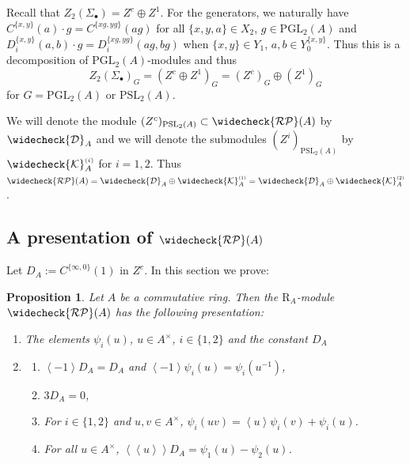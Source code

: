 \documentclass[12pt]{amsart}
\newtheorem{prop}[lem]{Proposition}
\theoremstyle{definition}
\newtheorem{rem}[lem]{Remark}
\renewcommand{\iff}{\Longleftrightarrow}
\newcommand{\K}{\mathcal{K}}
\newcommand{\wn}[1]{\mathcal{W}_{#1}}%
\newcommand{\pspl}[2]{\mathrm{PSL}_{#1}(#2)}
\newcommand{\pgl}[2]{\mathrm{PGL}_{#1}(#2)}
\newcommand{\crpb}[1]{\widecheck{\mathcal{RP}}(#1)}
\newcommand{\suss}[2]{\psi_{#1}\left( #2\right)}
\newcommand{\cks}[2]{\widecheck{{\K}}^{\mbox{\tiny $(#1)$}}_{#2}}
\newcommand{\cconst}[1]{D_{#1}}
\newcommand{\ccconstmod}[1]{\widecheck{\mathcal{D}}_{#1}}
\newcommand{\<}{\langle}
\renewcommand{\>}{\rangle}
\newcommand{\sgr}[1]{\mathrm{R}_{#1}}%
\newcommand{\an}[1]{\left\langle{#1}\right\rangle}
\newcommand{\pf}[1]{\left\langle\!\left\langle{#1}\right\rangle\!\right\rangle}
\begin{document}


Recall that $Z_2(\Sigma_\bullet)=Z^c\oplus Z^1$. For the generators, we naturally have $C^{\{ x,y\}}(a)\cdot g=C^{\{ xg,yg\}}(ag)$ for all $\{x,y,a\}\in X_2$, $g\in \pgl{2}{A}$ and 
$D_i^{\{ x,y\}}(a,b)\cdot g=D_i^{\{ xg,yg\}}(ag,bg)$ when $\{ x,y\}\in Y_1$, $a,b\in Y^{\{ x,y\}}_0$. Thus this is a decomposition of $\pgl{2}{A}$-modules and thus 
\[
Z_2(\Sigma_\bullet)_G=(Z^c\oplus Z^1)_G=(Z^c)_G\oplus (Z^1)_G
\]
for $G=\pgl{2}{A}$ or $\pspl{2}{A}$.


We will denote the module $(Z^c)_{\pspl{2}{A}}\subset \crpb{A}$ by $\ccconstmod{A}$ and we will denote the submodules $(Z^i)_{\pspl{2}{A}}$ by $\cks{i}{A}$ for $i=1,2$. Thus
$\crpb{A}=\ccconstmod{A}\oplus \cks{1}{A}=\ccconstmod{A}\oplus \cks{2}{A}$.

\subsection{A presentation of $\crpb{A}$}
Let $\cconst{A}:=C^{\{ \infty,0\}}(1)$ in $Z^c$. In this section we prove:

\begin{prop}\label{prop:crpbpres}  Let $A$ be a commutative ring. Then the $\sgr{A}$-module $\crpb{A}$ has the following presentation:

\begin{enumerate}
\item[Generators:] The elements $\suss{i}{u}$, $u\in A^\times$, $i\in \{ 1,2\}$ and the constant $\cconst{A}$
\item[Relations:]
\begin{enumerate}
\item $\an{-1}\cconst{A}=\cconst{A}$ and $\an{-1}\suss{i}{u}=\suss{i}{u^{-1}}$,
\item $3\cconst{A}=0$,
\item For $i\in \{ 1,2\}$ and $u,v\in A^\times$, $\suss{i}{uv}=\an{u}\suss{i}{v}+\suss{i}{u}$.
\item For all $u\in A^\times$, $\pf{u}\cconst{A}=\suss{1}{u}-\suss{2}{u}$.
\end{enumerate}
\end{enumerate}
\end{prop}
\end{document}

